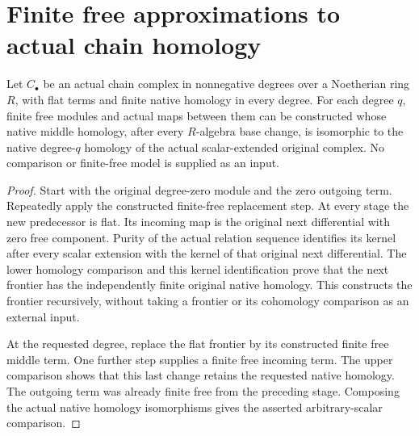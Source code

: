 \section{Finite free approximations to actual chain homology}

\begin{theorem}
\label{thm:kn-derived-finite-free-triples}
\leanok
Let $C_\bullet$ be an actual chain complex in nonnegative degrees over
a Noetherian ring $R$, with flat terms and finite native homology in
every degree.  For each degree $q$, finite free modules and actual
maps between them can be constructed whose native middle homology,
after every $R$-algebra base change, is isomorphic to the native
degree-$q$ homology of the actual scalar-extended original complex.
No comparison or finite-free model is supplied as an input.
\end{theorem}
\begin{proof}
Start with the original degree-zero module and the zero outgoing
term.  Repeatedly apply the constructed finite-free replacement step.
At every stage the new predecessor is flat.  Its incoming map is
the original next differential with zero free component.  Purity of
the actual relation sequence identifies its kernel after every scalar
extension with the kernel of that original next differential.
The lower homology comparison and this kernel identification prove
that the next frontier has the independently finite original native
homology.  This constructs the frontier recursively, without taking
a frontier or its cohomology comparison as an external input.

At the requested degree, replace the flat frontier by its constructed
finite free middle term.  One further step supplies a finite free
incoming term.  The upper comparison shows that this last change
retains the requested native homology.  The outgoing term was already
finite free from the preceding stage.  Composing the actual native
homology isomorphisms gives the asserted arbitrary-scalar comparison.
\end{proof}

